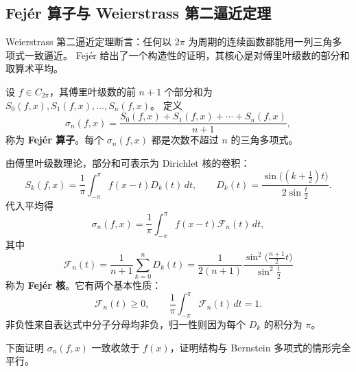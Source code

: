 \subsection{Fejér 算子与 Weierstrass 第二逼近定理}

Weierstrass 第二逼近定理断言：任何以 $2\pi$ 为周期的连续函数都能用一列三角多项式一致逼近。
Fejér 给出了一个构造性的证明，其核心是对傅里叶级数的部分和取算术平均。

设 $f\in C_{2\pi}$，其傅里叶级数的前 $n+1$ 个部分和为 $S_0(f,x),S_1(f,x),\dots ,S_n(f,x)$。
定义
\[
\sigma_n(f,x)=\frac{S_0(f,x)+S_1(f,x)+\cdots +S_n(f,x)}{n+1},
\]
称为 \textbf{Fejér 算子}。每个 $\sigma_n(f,x)$ 都是次数不超过 $n$ 的三角多项式。

由傅里叶级数理论，部分和可表示为 Dirichlet 核的卷积：
\[
S_k(f,x)=\frac1\pi\int_{-\pi}^{\pi}f(x-t)D_k(t)\,dt,\qquad 
D_k(t)=\frac{\sin\bigl((k+\frac12)t\bigr)}{2\sin\frac{t}{2}}.
\]
代入平均得
\[
\sigma_n(f,x)=\frac1\pi\int_{-\pi}^{\pi}f(x-t)\mathcal{F}_n(t)\,dt,
\]
其中
\[
\mathcal{F}_n(t)=\frac1{n+1}\sum_{k=0}^{n}D_k(t)
=\frac{1}{2(n+1)}\frac{\sin^2\!\bigl(\frac{n+1}{2}t\bigr)}{\sin^2\frac{t}{2}}
\]
称为 \textbf{Fejér 核}。它有两个基本性质：
\[
\mathcal{F}_n(t)\ge 0,\qquad 
\frac1\pi\int_{-\pi}^{\pi}\mathcal{F}_n(t)\,dt=1.
\]
非负性来自表达式中分子分母均非负，归一性则因为每个 $D_k$ 的积分为 $\pi$。

下面证明 $\sigma_n(f,x)$ 一致收敛于 $f(x)$，证明结构与 Bernstein 多项式的情形完全平行。

